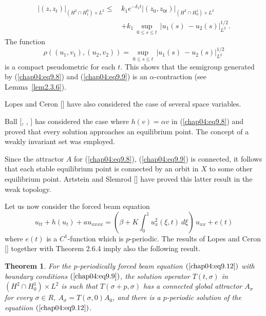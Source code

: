 \documentclass{surv-l}
\theoremstyle{plain}
\newtheorem{theorem}{Theorem}[section]
\theoremstyle{definition}
\numberwithin{equation}{section}
\numberwithin{figure}{chapter}
\begin{document}
\begin{align*}
|(z, z_{t})|_{(H^{2}\cap H_{1}^{0})\times L^{2}} \leq\, & k_{1}e^{-\delta_{1}t}|(z_{0}, z_{0t})|_{(H^{2}\cap H_{0}^{1})\times L^{2}} \\
& +k_{1}\,\sup_{0\leq s\leq t}\,|u_{1}(s)\ -u_{2}(s)|_{L^{2}}^{1/2}.
\end{align*}
The function
\begin{equation*}
\rho((u_{1}, v_{1}), (u_{2}, v_{2}))=\sup_{0\leq s\leq t}\,|u_{1}(s)\ -u_{2}(s)|_{L^{2}}^{1/2}
\end{equation*}
is a compact pseudometric for each $t$. This shows that the semigroup generated by (\ref{chap04:eq9.8}) and (\ref{chap04:eq9.9}) is an $\alpha$-contraction (see Lemma~\ref{lem2.3.6}).

Lopes and Ceron [\citeyear{1984lc}] have also considered the case of several space variables.

Ball [\citeyear{1973ba}, \citeyear{1973bb}, \citeyear{1973bc}] has considered the case where $h(v)=\alpha v$ in (\ref{chap04:eq9.8}) and proved that every solution approaches an equilibrium point. The concept of a weakly invariant set was employed.

Since the attractor $A$ for (\ref{chap04:eq9.8}), (\ref{chap04:eq9.9}) is connected, it follows that each stable equilibrium point is connected by an orbit in $X$ to some other equilibrium point. Artstein and Slemrod [\citeyear{1982as}] have proved this latter result in the weak topology.

Let us now consider the forced beam equation
\begin{equation}\label{chap04:eq9.12}
u_{tt}+h(u_{t})+au_{xxxx}=\left(\beta+K\int_{0}^{1}u_{x}^{2}(\xi, t)\ d\xi\right)\,u_{xx}+e(t)
\end{equation}
where $e(t)$ is a $C^{1}$-function which is $p$-periodic. The results of Lopes and Ceron [\citeyear{1984lc}] together with Theorem 2.6.4 imply also the following result.

\begin{theorem}\label{thm4.9.4} For the $p$-periodically forced beam equation $(\ref{chap04:eq9.12})$ with boundary conditions $(\ref{chap04:eq9.9})$, the solution operator $T(t, \sigma)$ in $(H^{2}\cap H_{0}^{1})\times L^{2}$ is such that $T(\sigma+p, \sigma)$ has a connected global attractor $A_{\sigma}$ for every $\sigma\in R,\ A_{\sigma}=T(\sigma, 0)A_{0}$, and there is a $p$-periodic solution of the equatiion $(\ref{chap04:eq9.12})$.
\end{theorem}
\end{document}
